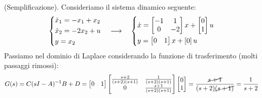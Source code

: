 \begin{esem}
(Semplificazione). Consideriamo il sistema dinamico seguente:
\begin{equation*}
\begin{dcases}
\dot x_1 = -x_1 + x_2  \\
\dot x_2 = -2x_2 + u \\
y=x_2
\end{dcases} \quad \longrightarrow \quad 
\begin{dcases}
\dot x = \begin{bmatrix}
-1 & 1 \\ 0 & -2
\end{bmatrix} x + \begin{bmatrix}
0 \\ 1
\end{bmatrix} u \\
y = \begin{bmatrix}
0 & 1
\end{bmatrix} x + \left[ 0 \right] u
\end{dcases}
\end{equation*}
Passiamo nel dominio di Laplace considerando la funzione di trasferimento (molti passaggi rimossi):
\begin{equation*}
G(s) = C(sI-A)^{-1}B+D = \begin{bmatrix}
0 & 1
\end{bmatrix}\begin{bmatrix}
\frac{s+2}{(s+2)(s+1)} & \frac{1}{(s+2)(s+1)} \\ 0 & \frac{s+1}{(s+2)(s+1)}
\end{bmatrix}\begin{bmatrix}
0 \\ 1
\end{bmatrix} = \frac{\cancel{s+1}}{(s+2)\cancel{(s+1)}} = \frac{1}{s+2} 
\end{equation*}
\end{esem}

